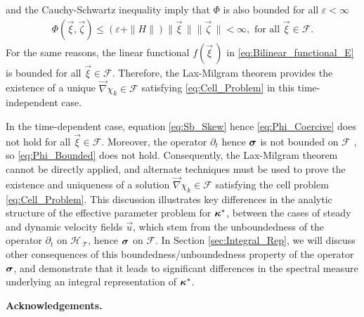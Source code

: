\documentclass[11pt]{amsart}
\newcommand{\Tc}{\mathcal{T}}
\newcommand{\Hs}{\mathscr{H}}
\newcommand{\Fs}{\mathscr{F}}
\newcommand\bsig{\mbox{\boldmath${\sigma}$}}
\newcommand\bkappa{\mbox{\boldmath${\kappa}$}}
\begin{document}
and the Cauchy-Schwartz inequality imply that $\Phi$ is also bounded for
all $\varepsilon<\infty$
%
\begin{align}\label{eq:Phi_Bounded}
  \Phi(\vec{\xi},\vec{\zeta})\leq(\varepsilon+\|H\|)\|\vec{\xi}\,\|\|\vec{\zeta}\,\|<\infty,
  \text{ for all } \vec{\xi}\in\Fs.
\end{align}
%
For the same reasons, the linear functional $f(\vec{\xi}\,)$ in
\eqref{eq:Bilinear_functional_E} is bounded for all
$\vec{\xi}\in\Fs$. Therefore, the Lax-Milgram theorem
\cite{McOwen:2003:PDE} provides the existence of a unique
$\vec{\nabla}\chi_k\in\Fs$ satisfying \eqref{eq:Cell_Problem} in this
time-independent case. 


In the time-dependent case, equation \eqref{eq:Sb_Skew} hence
\eqref{eq:Phi_Coercive} does not hold for all $\vec{\xi}\in\Fs$. Moreover, 
the operator $\partial_t$ hence $\bsig$ is not bounded on $\Fs$
\cite{Reed-1980,Stakgold:BVP:2000}, so \eqref{eq:Phi_Bounded} does not
hold. Consequently, the Lax-Milgram theorem cannot be directly
applied, and alternate techniques  
\cite{Friedman:1969:PDE,Friedman:1969:PDE:Parabolic} must be used to
prove the existence and uniqueness of a solution $\vec{\nabla}\chi_k\in\Fs$ 
satisfying the cell problem \eqref{eq:Cell_Problem}. This discussion
illustrates key differences in the analytic structure of the effective
parameter problem for $\bkappa^*$, between the cases of steady and
dynamic velocity fields $\vec{u}$, which stem from the unboundedness
of the operator $\partial_t$ on $\Hs_{\,\Tc}$, hence $\bsig$ on $\Fs$. In Section
\ref{sec:Integral_Rep}, we will discuss other consequences of this
boundedness/unboundedness property of the operator $\bsig$, and
demonstrate that it leads to significant differences in the spectral
measure underlying an  integral representation of $\bkappa^*$.     






\medskip

{\bf Acknowledgements.}


\medskip



\end{document}
